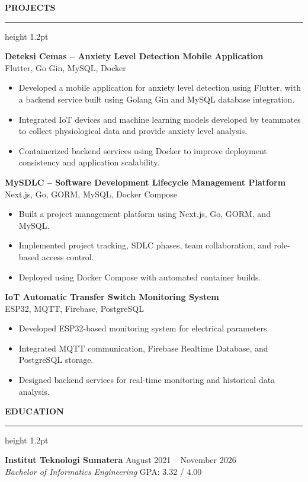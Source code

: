 \documentclass[11pt,a4paper]{article}
\newcommand{\secfontsize}{14}
\newcommand{\seclineheight}{1.2pt}
\newcommand{\secgapabove}{14pt}
\newcommand{\secgaptitle}{6pt}
\newcommand{\secgapbelow}{10pt}
\newcommand{\cvsection}[1]{%
    \par\vspace{\secgapabove}%
    {\fontsize{\secfontsize}{\numexpr\secfontsize+3\relax}\selectfont\bfseries\scshape #1}\par
    \vspace{\secgaptitle}%
    {\color{black}\hrule height \seclineheight}%
    \vspace{\secgapbelow}%
    \noindent\ignorespaces
}
\newcommand{\techstack}[1]{{\small\color{muted}#1}}
\begin{document}
\vspace{8pt}

\cvsection{PROJECTS}
\textbf{Deteksi Cemas -- Anxiety Level Detection Mobile Application}\\[2pt]
\techstack{Flutter, Go Gin, MySQL, Docker}
\begin{itemize}
\item Developed a mobile application for anxiety level detection using Flutter, with a backend service built using Golang Gin and MySQL database integration.
\item Integrated IoT devices and machine learning models developed by teammates to collect physiological data and provide anxiety level analysis.
\item Containerized backend services using Docker to improve deployment consistency and application scalability.
\end{itemize}

\vspace{4pt}

\textbf{MySDLC -- Software Development Lifecycle Management Platform}\\[2pt]
\techstack{Next.js, Go, GORM, MySQL, Docker Compose}
\begin{itemize}
\item Built a project management platform using Next.js, Go, GORM, and MySQL.
\item Implemented project tracking, SDLC phases, team collaboration, and role-based access control.
\item Deployed using Docker Compose with automated container builds.
\end{itemize}

\vspace{4pt}

\textbf{IoT Automatic Transfer Switch Monitoring System}\\[2pt]
\techstack{ESP32, MQTT, Firebase, PostgreSQL}
\begin{itemize}
\item Developed ESP32-based monitoring system for electrical parameters.
\item Integrated MQTT communication, Firebase Realtime Database, and PostgreSQL storage.
\item Designed backend services for real-time monitoring and historical data analysis.
\end{itemize}

\cvsection{EDUCATION}
\textbf{Institut Teknologi Sumatera}
\hfill
August 2021 -- November 2026 \\
\textit{Bachelor of Informatics Engineering} \hfill GPA: 3.32 / 4.00
\end{document}
